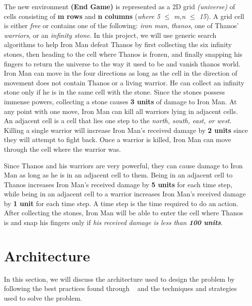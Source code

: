 \documentclass{article}
\begin{document}
The new environment \textbf{(End Game)} is represented as a 2D grid \textit{(universe)} of cells consisting of \textbf{m rows} and \textbf{n columns} (\textit{where 5 $\leq$ m,n $\leq$ 15}). A grid cell is either \textit{free} or contains one of the following: \textit{iron man}, \textit{thanos}, one of Thanos’ \textit{warriors}, or an \textit{infinity stone}. In this project, we will use generic search algorithms to help Iron Man defeat Thanos by first collecting the six infinity stones, then heading to the cell where Thanos is frozen, and finally snapping his fingers to return the universe to the way it used to be and vanish thanos world. Iron Man can move in the four directions as long as the cell in the direction of movement does not contain Thanos or a living warrior. He can collect an infinity stone only if he is in the same cell with the stone. Since the stones possess immense powers, collecting a stone causes \textbf{3 units} of damage to Iron Man. At any point with one move, Iron Man can kill all warriors lying in adjacent cells. An adjacent cell is a cell that lies one step to the \textit{north, south, east, or west}. Killing a single warrior will increase Iron Man’s received damage by \textbf{2 units} since they will attempt to fight back. Once a warrior is killed, Iron Man can move through the cell where the warrior was. 

Since Thanos and his warriors are very powerful, they can cause damage to Iron Man as long as he is in an adjacent cell to them. Being in an adjacent cell to Thanos increases Iron Man’s received damage by \textbf{5 units} for each time step, while being in an adjacent cell to a warrior increases Iron Man’s received damage by \textbf{1 unit} for each time step. A time step is the time required to do an action. After collecting the stones, Iron Man will be able to enter the cell where Thanos is and snap his fingers only if \textit{his received damage is less than \textbf{100 units}}.



\section{Architecture}
\label{sec:architecture}

In this section, we will discuss the architecture used to design the problem by following the best practices found through ~\cite{aimajava, aimapython} and the techniques and strategies used to solve the problem. 
\end{document}
